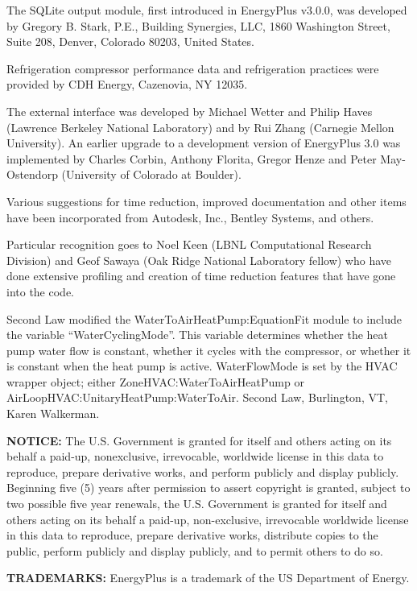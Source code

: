 The SQLite output module, first introduced in EnergyPlus v3.0.0, was developed by Gregory B. Stark, P.E., Building Synergies, LLC, 1860 Washington Street, Suite 208, Denver, Colorado 80203, United States.

Refrigeration compressor performance data and refrigeration practices were provided by CDH Energy, Cazenovia, NY 12035.

The external interface was developed by Michael Wetter and Philip Haves (Lawrence Berkeley National Laboratory) and by Rui Zhang (Carnegie Mellon University). An earlier upgrade to a development version of EnergyPlus 3.0 was implemented by Charles Corbin, Anthony Florita, Gregor Henze and Peter May-Ostendorp (University of Colorado at Boulder).

Various suggestions for time reduction, improved documentation and other items have been incorporated from Autodesk, Inc., Bentley Systems, and others.

Particular recognition goes to Noel Keen (LBNL Computational Research Division) and Geof Sawaya (Oak Ridge National Laboratory fellow) who have done extensive profiling and creation of time reduction features that have gone into the code.

Second Law modified the WaterToAirHeatPump:EquationFit module to include the variable ``WaterCyclingMode''. This variable determines whether the heat pump water flow is constant, whether it cycles with the compressor, or whether it is constant when the heat pump is active. WaterFlowMode is set by the HVAC wrapper object; either ZoneHVAC:WaterToAirHeatPump or AirLoopHVAC:UnitaryHeatPump:WaterToAir. Second Law, Burlington, VT, Karen Walkerman.

\textbf{NOTICE:} The U.S. Government is granted for itself and others acting on its behalf a paid-up, nonexclusive, irrevocable, worldwide license in this data to reproduce, prepare derivative works, and perform publicly and display publicly. Beginning five (5) years after permission to assert copyright is granted, subject to two possible five year renewals, the U.S. Government is granted for itself and others acting on its behalf a paid-up, non-exclusive, irrevocable worldwide license in this data to reproduce, prepare derivative works, distribute copies to the public, perform publicly and display publicly, and to permit others to do so.

\textbf{TRADEMARKS:} EnergyPlus is a trademark of the US Department of Energy.
